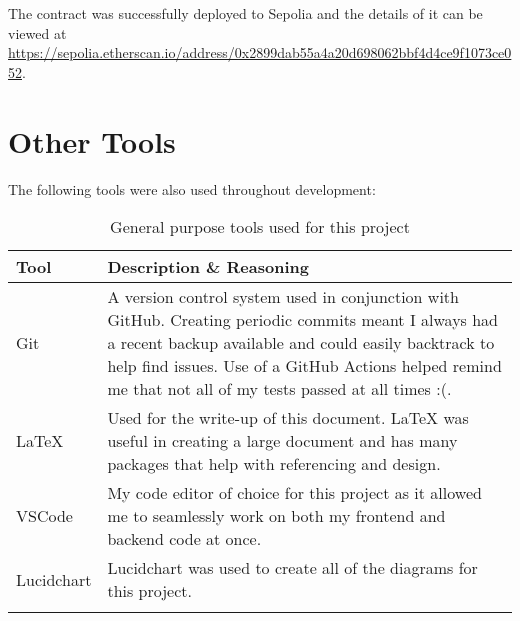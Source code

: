 \vspace{2mm}\noindent
The contract was successfully deployed to Sepolia and the details of it can be viewed at \url{https://sepolia.etherscan.io/address/0x2899dab55a4a20d698062bbf4d4ce9f1073ce052}.

\section{Other Tools}

The following tools were also used throughout development:

\begin{longtable}{p{} p{}}
  \toprule
  \textbf{Tool} & \textbf{Description \& Reasoning}
  \\\midrule\midrule
  Git
  & A version control system used in conjunction with GitHub. Creating periodic commits meant I always had a recent backup available and could easily backtrack to help find issues. Use of a GitHub Actions helped remind me that not all of my tests passed at all times :(.\\
  LaTeX
  & Used for the write-up of this document. LaTeX was useful in creating a large document and has many packages that help with referencing and design.\\
  VSCode
  & My code editor of choice for this project as it allowed me to seamlessly work on both my frontend and backend code at once.\\
  Lucidchart
  & Lucidchart was used to create all of the diagrams for this project.
  \\\bottomrule\bottomrule
  \caption{General purpose tools used for this project}
\end{longtable}

